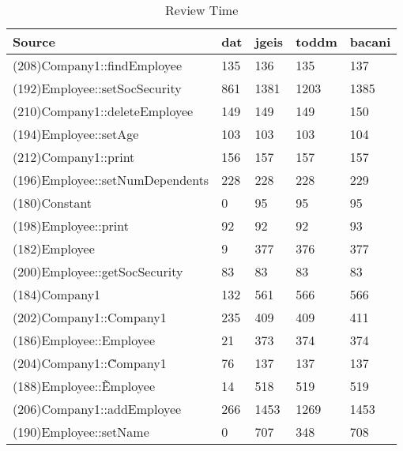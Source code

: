 \begin{table}[hb]
\begin{center}
\begin{tabular}{|l|l|l|l|l|}
\hline
Source & dat & jgeis & toddm & bacani\\
\hline
(208)Company1::findEmployee & 135 & 136 & 135 & 137\\
(192)Employee::setSocSecurity & 861 & 1381 & 1203 & 1385\\
(210)Company1::deleteEmployee & 149 & 149 & 149 & 150\\
(194)Employee::setAge & 103 & 103 & 103 & 104\\
(212)Company1::print & 156 & 157 & 157 & 157\\
(196)Employee::setNumDependents & 228 & 228 & 228 & 229\\
(180)Constant & 0 & 95 & 95 & 95\\
(198)Employee::print & 92 & 92 & 92 & 93\\
(182)Employee & 9 & 377 & 376 & 377\\
(200)Employee::getSocSecurity & 83 & 83 & 83 & 83\\
(184)Company1 & 132 & 561 & 566 & 566\\
(202)Company1::Company1 & 235 & 409 & 409 & 411\\
(186)Employee::Employee & 21 & 373 & 374 & 374\\
(204)Company1::\~Company1 & 76 & 137 & 137 & 137\\
(188)Employee::\~Employee & 14 & 518 & 519 & 519\\
(206)Company1::addEmployee & 266 & 1453 & 1269 & 1453\\
(190)Employee::setName & 0 & 707 & 348 & 708\\
\hline
\end{tabular}
\end{center}
\caption{Review Time}
\end{table}


